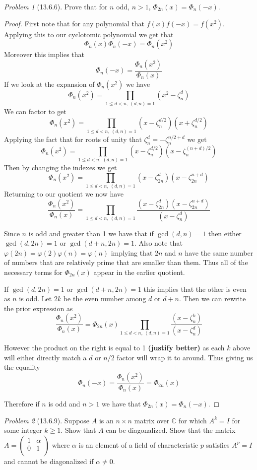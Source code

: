 \documentclass[10pt]{article}
\newcommand{\sk}{\vskip 10mm}
\newcommand{\bb}[1]{\mathbb{#1}}
\theoremstyle{remark}
\newtheorem{problem}{Problem}
\theoremstyle{remark}
\begin{document}
\begin{problem}[13.6.6]
  Prove that for $n$ odd, $n>1$, $\Phi_{2n}(x)=\Phi_n(-x)$.
\end{problem}

\begin{proof}
  First note that for any polynomial that $f(x)f(-x)=f(x^2)$.
  Applying this to our cyclotomic polynomial we get that
  \[
    \Phi_n(x)\Phi_n(-x)=\Phi_n(x^2)
  \]
  Moreover this implies that
  \[
    \Phi_n(-x)=\frac{\Phi_n(x^2)}{\Phi_n(x)}
  \]
  If we look at the expansion of $\Phi_n(x^2)$ we have
  \[
    \Phi_n(x^2)=\prod_{1\leq d<n,\ (d,n)=1}(x^2-\zeta_n^d)
  \]
  We can factor to get
  \[
    \Phi_n(x^2)=\prod_{1\leq d<n,\ (d,n)=1}(x-\zeta_n^{d/2})(x+\zeta_n^{d/2})
  \]
  Applying the fact that for roots of unity that $\zeta_n^d=-\zeta_n^{n/2+d}$
  we get
  \[
    \Phi_n(x^2)=\prod_{1\leq d<n,\ (d,n)=1}(x-\zeta_n^{d/2})(x-\zeta_n^{(n+d)/2})
  \]
  Then by changing the indexes we get
  \[
    \Phi_n(x^2)=\prod_{1\leq d<n,\ (d,n)=1}(x-\zeta_{2n}^d)(x-\zeta_{2n}^{n+d})
  \]
  Returning to our quotient we now have
  \[
    \frac{\Phi_n(x^2)}{\Phi_n(x)}=\prod_{1\leq d<n,\ (d,n)=1}\frac{(x-\zeta_{2n}^d)(x-\zeta_{2n}^{n+d})}{(x-\zeta_n^d)}
  \]

  Since $n$ is odd and greater than 1 we have that if $\gcd(d,n)=1$ then either
  $\gcd(d,2n)=1$ or $\gcd(d+n,2n)=1$. Also note that $\varphi(2n)=\varphi(2)\varphi(n)=\varphi(n)$ implying
  that $2n$ and $n$ have the same number of numbers that are relatively prime that
  are smaller than them. Thus all of the necessary terms for $\Phi_{2n}(x)$ appear in
  the earlier quotient.

  If $\gcd(d,2n)=1$ or $\gcd(d+n,2n)=1$ this implies that the other is even
  as $n$ is odd. Let $2k$ be the even number among $d$ or $d+n$. Then we can
  rewrite the prior expression as
  \[
    \frac{\Phi_n(x^2)}{\Phi_n(x)}=\Phi_{2n}(x)\prod_{1\leq d<n,\ (d,n)=1}\frac{(x-\zeta_n^k)}{(x-\zeta_n^d)}
  \]

  However the product on the right is equal to 1 \textbf{(justify better)} as
  each $k$ above will either directly match a $d$ or $n/2$ factor will wrap it
  to around. Thus giving us the equality
  \[
    \Phi_n(-x)=\frac{\Phi_n(x^2)}{\Phi_n(x)}=\Phi_{2n}(x)
  \]

  Therefore if $n$ is odd and $n>1$ we have that $\Phi_{2n}(x)=\Phi_n(-x)$.
\end{proof}

\sk

\begin{problem}[13.6.9]
  Suppose $A$ is an $n\times n$ matrix over $\bb{C}$ for which $A^k=I$
  for some integer $k\geq1$. Show that $A$ can be diagonalized.
  Show that the matrix
  $A=\left(\begin{array}{cc}1&\alpha\\0&1\\ \end{array}\right)$
  where $\alpha$ is an element of a field of characteristic $p$ satisfies
  $A^p=I$ and cannot be diagonalized if $\alpha\neq 0$.
\end{problem}
\end{document}
